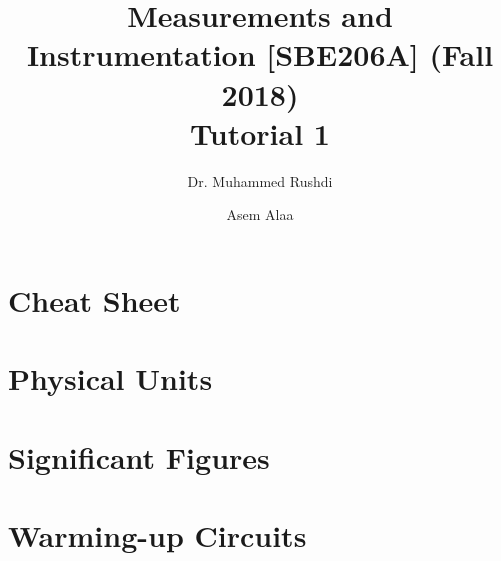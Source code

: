 \documentclass[a4paper,11pt]{book}
\begin{document}
\author{Dr. Muhammed Rushdi \and Asem Alaa}

\title{Measurements and Instrumentation [SBE206A] (Fall 2018)\\ Tutorial 1}

\maketitle

\chapter*{Cheat Sheet}


\chapter*{Physical Units}



\chapter*{Significant Figures}


\chapter*{Warming-up Circuits}
\end{document}
